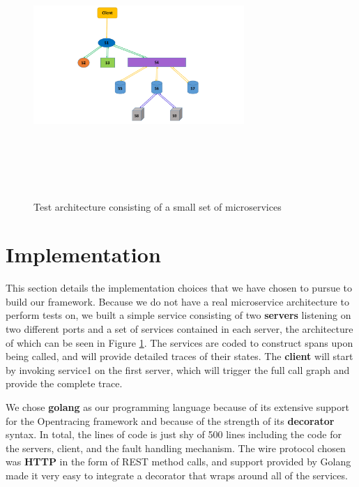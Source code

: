 

\begin{figure}
\centering
\includegraphics[width=8cm,height=10cm,keepaspectratio=true]{toy_architecture}
\caption{Test architecture consisting of a small set of microservices}
\label{toy_arch}
\end{figure}


\section{Implementation} \label{implementation}
This section details the implementation choices that we have chosen to pursue to build our framework. Because we do not have a real microservice architecture to perform tests on, we built a simple service consisting of two \textbf{servers} listening on two different ports and a set of services contained in each server, the architecture of which can be seen in Figure \ref{toy_arch}. The services are coded to construct spans upon being called, and will provide detailed traces of their states. The \textbf{client} will start by invoking service1 on the first server, which will trigger the full call graph and provide the complete trace.

We chose \textbf{golang}\cite{google:golang} as our programming language because of its extensive support for the Opentracing framework and because of the strength of its \textbf{decorator} syntax. In total, the lines of code is just shy of 500 lines including the code for the servers, client, and the fault handling mechanism. The wire protocol chosen was \textbf{HTTP} in the form of REST method calls, and support provided by Golang made it very easy to integrate a decorator that wraps around all of the services. 

